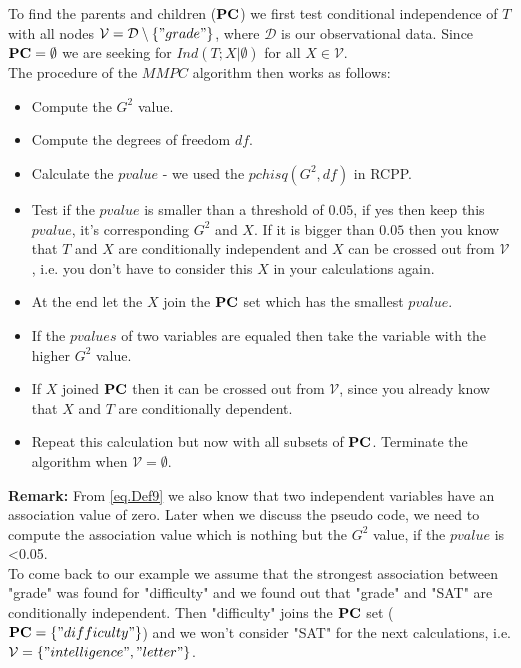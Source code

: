 			 \label{img.gradeSelected}

			To find the parents and children (${\textbf{PC}}$) we first test conditional independence of $T$ with all nodes $\mathcal{V} = \mathcal{D} \setminus \{"grade"\}$, where $\mathcal{D}$ is our observational data. Since ${\textbf{PC}} = \emptyset$ we are seeking for $Ind(T; X | \emptyset)$ for all $X \in \mathcal{V}$.\\
			The procedure of the $MMPC$ algorithm then works as follows:

			\begin{itemize}
				\item Compute the $G^{2}$ value.
				\item Compute the degrees of freedom $df$.
				\item Calculate the $pvalue$ - we used the $pchisq(G^{2}, df)$ in RCPP.
				\item Test if the $pvalue$ is smaller than a threshold of $0.05$, if yes then keep this $pvalue$, it's corresponding $G^{2}$ and $X$. If it is bigger than $0.05$ then you know that $T$ and $X$ are conditionally independent and $X$ can be crossed out from $\mathcal{V}$, i.e. you don't have to consider this $X$ in your calculations again.
				\item At the end let the $X$ join the ${\textbf{PC}}$ set which has the smallest $pvalue$.
				\item If the $pvalues$ of two variables are equaled then take the variable with the higher $G^{2}$ value.
				\item If $X$ joined ${\textbf{PC}}$ then it can be crossed out from $\mathcal{V}$, since you already know that $X$ and $T$ are conditionally dependent.
				\item Repeat this calculation but now with all subsets of ${\textbf{PC}}$. Terminate the algorithm when $\mathcal{V} = \emptyset$.
			\end{itemize}

			\textbf{Remark:} From \autoref{eq.Def9} we also know that two independent variables have an association value of zero. Later when we discuss the pseudo code, we need to compute the association value which is nothing but the $G^{2}$ value, if the $pvalue$ is \textless 0.05. \\

			To come back to our example we assume that the strongest association between "grade" was found for "difficulty" and we found out that "grade" and "SAT" are conditionally independent. Then "difficulty" joins the ${\textbf{PC}}$ set (${\textbf{PC}} = \{"difficulty"\}$) and we won't consider "SAT" for the next calculations, i.e. $\mathcal{V} = \{ "intelligence", "letter" \}$.

